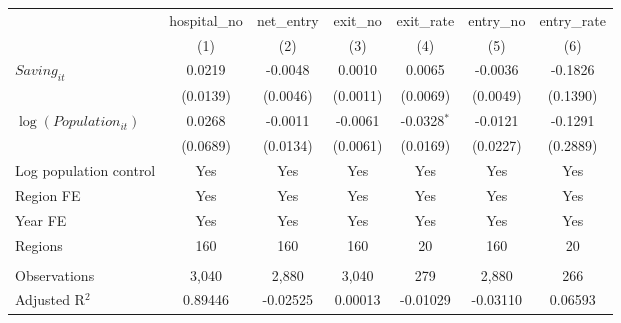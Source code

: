 \begingroup
\centering
\begin{tabular}{lcccccc}
   \toprule
                            & hospital\_no  & net\_entry  & exit\_no  & exit\_rate    & entry\_no  & entry\_rate \\    
                            & (1)           & (2)         & (3)       & (4)           & (5)        & (6)\\  
   \midrule 
   $Saving_{it}$            & 0.0219        & -0.0048     & 0.0010    & 0.0065        & -0.0036    & -0.1826\\   
                            & (0.0139)      & (0.0046)    & (0.0011)  & (0.0069)      & (0.0049)   & (0.1390)\\   
   $\log(Population_{it})$  & 0.0268        & -0.0011     & -0.0061   & -0.0328$^{*}$ & -0.0121    & -0.1291\\   
                            & (0.0689)      & (0.0134)    & (0.0061)  & (0.0169)      & (0.0227)   & (0.2889)\\   
   Log population control   & Yes           & Yes         & Yes       & Yes           & Yes        & Yes\\  
   Region FE                & Yes           & Yes         & Yes       & Yes           & Yes        & Yes\\  
   Year FE                  & Yes           & Yes         & Yes       & Yes           & Yes        & Yes\\  
   Regions                  & 160           & 160         & 160       & 20            & 160        & 20\\  
    \\
   Observations             & 3,040         & 2,880       & 3,040     & 279           & 2,880      & 266\\  
   Adjusted R$^2$           & 0.89446       & -0.02525    & 0.00013   & -0.01029      & -0.03110   & 0.06593\\  
   \bottomrule
\end{tabular}
\par\endgroup
